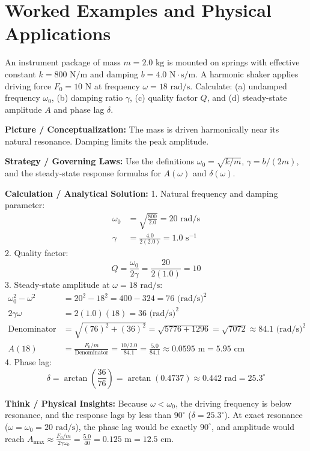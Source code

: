 \section{Worked Examples and Physical Applications}

\begin{psctexample}
An instrument package of mass $m = 2.0\text{ kg}$ is mounted on springs with effective constant $k = 800\text{ N/m}$ and damping $b = 4.0\text{ N}\cdot\text{s/m}$. A harmonic shaker applies driving force $F_0 = 10\text{ N}$ at frequency $\omega = 18\text{ rad/s}$.
Calculate: (a) undamped frequency $\omega_0$, (b) damping ratio $\gamma$, (c) quality factor $Q$, and (d) steady-state amplitude $A$ and phase lag $\delta$.

\textbf{\color{rbruNavy}Picture / Conceptualization:}
The mass is driven harmonically near its natural resonance. Damping limits the peak amplitude.

\textbf{\color{rbruNavy}Strategy / Governing Laws:}
Use the definitions $\omega_0 = \sqrt{k/m}$, $\gamma = b/(2m)$, and the steady-state response formulas for $A(\omega)$ and $\delta(\omega)$.

\textbf{\color{rbruNavy}Calculation / Analytical Solution:}
1. Natural frequency and damping parameter:
\begin{align}
\omega_0 &= \sqrt{\frac{800}{2.0}} = 20\text{ rad/s} \\
\gamma &= \frac{4.0}{2(2.0)} = 1.0\text{ s}^{-1}
\end{align}
2. Quality factor:
\begin{equation}
Q = \frac{\omega_0}{2\gamma} = \frac{20}{2(1.0)} = 10
\end{equation}
3. Steady-state amplitude at $\omega = 18\text{ rad/s}$:
\begin{align}
\omega_0^2 - \omega^2 &= 20^2 - 18^2 = 400 - 324 = 76\text{ (rad/s)}^2 \\
2\gamma\omega &= 2(1.0)(18) = 36\text{ (rad/s)}^2 \\
\text{Denominator} &= \sqrt{(76)^2 + (36)^2} = \sqrt{5776 + 1296} = \sqrt{7072} \approx 84.1\text{ (rad/s)}^2 \\
A(18) &= \frac{F_0 / m}{\text{Denominator}} = \frac{10 / 2.0}{84.1} = \frac{5.0}{84.1} \approx 0.0595\text{ m} = 5.95\text{ cm}
\end{align}
4. Phase lag:
\begin{equation}
\delta = \arctan\left(\frac{36}{76}\right) = \arctan(0.4737) \approx 0.442\text{ rad} = 25.3^\circ
\end{equation}

\textbf{\color{rbruNavy}Think / Physical Insights:}
Because $\omega < \omega_0$, the driving frequency is below resonance, and the response lags by less than $90^\circ$ ($\delta = 25.3^\circ$). At exact resonance ($\omega = \omega_0 = 20\text{ rad/s}$), the phase lag would be exactly $90^\circ$, and amplitude would reach $A_{\text{max}} \approx \frac{F_0/m}{2\gamma\omega_0} = \frac{5.0}{40} = 0.125\text{ m} = 12.5\text{ cm}$.
\qedexam
\end{psctexample}

